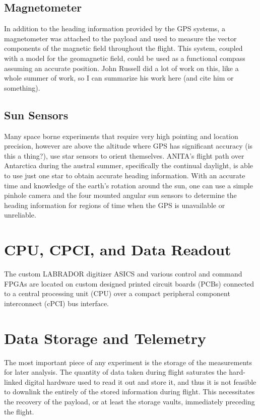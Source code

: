 	\subsection{Magnetometer}
		In addition to the heading information provided by the GPS systems, a magnetometer was attached to the payload and used to measure the vector components of the magnetic field throughout the flight.  This system, coupled with a model for the geomagnetic field, could be used as a functional compass assuming an accurate position.  John Russell did a lot of work on this, like a whole summer of work, so I can summarize his work here (and cite him or something).
	\subsection{Sun Sensors}
		Many space borne experiments that require very high pointing and location precision, however are above the altitude where GPS has significant accuracy (is this a thing?), use star sensors to orient themselves.  ANITA's flight path over Antarctica during the austral summer, specifically the continual daylight, is able to use just one star to obtain accurate heading information.  With an accurate time and knowledge of the earth's rotation around the sun, one can use a simple pinhole camera and the four mounted angular sun sensors to determine the heading information for regions of time when the GPS is unavailable or unreliable.
		
\section{CPU, CPCI, and Data Readout}
	The custom LABRADOR digitizer ASICS and various control and command FPGAs are located on custom designed printed circuit boards (PCBs) connected to a central processing unit (CPU) over a compact peripheral component interconnect (cPCI) bus interface.  
	
\section{Data Storage and Telemetry}
	The most important piece of any experiment is the storage of the measurements for later analysis.  The quantity of data taken during flight saturates the hard-linked digital hardware used to read it out and store it, and thus it is not feasible to downlink the entirely of the stored information during flight.  This necessitates the recovery of the payload, or at least the storage vaults, immediately preceding the flight.

